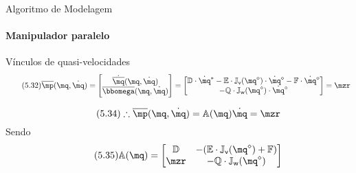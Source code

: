 \documentclass[25pt,landscape]{beamer}
\begin{document}
\begin{frame}{Algoritmo de Modelagem}
    \framesubtitle{Manipulador paralelo}
    \begin{block}{Vínculos de quasi-velocidades}
		\begin{equation} \label{eq:VinculosQuasiVel} \tag{5.32}
			\overline{\mp}(\mq,\dot{\mq}) = 
			\begin{bmatrix}
				\dot{\overline{\mq}}(\mq,\dot{\mq}) \\
				\overline{\momega}(\mq,\dot{\mq})
			\end{bmatrix}
			= 
			\begin{bmatrix}
				\mD \cdot \dot{\mq}^\ast  - \mE \cdot \mJ_{\mathsf{v}}(\mq^\diamond) \cdot \dot{\mq}^\diamond  - \mF \cdot \dot{\mq}^\diamond \\
				 - \mQ \cdot \mJ_{\mathsf{w}}(\mq^\diamond) \cdot \dot{\mq}^\diamond
			\end{bmatrix}
			=
			\mzr
		\end{equation}

		\pause
		\begin{equation} \label{eq:VinculosQuasiVel2} \tag{5.34}
			\therefore \overline{\mp}(\mq,\dot{\mq}) = \mA(\mq) \dot{\mq} = \mzr
		\end{equation}
		Sendo
		\begin{equation} \tag{5.35}
			\mA(\mq) = 
			\begin{bmatrix}
				\mD  & -(\mE \cdot \mJ_{\mathsf{v}}(\mq^\diamond) + \mF) \\
				\mzr & -\mQ \cdot \mJ_{\mathsf{w}}(\mq^\diamond) \\
			\end{bmatrix}
		\end{equation}
    \end{block}
\end{frame}
\end{document}
